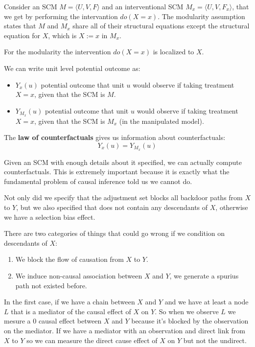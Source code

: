 \begin{definition}
    Consider an SCM $M=\langle U, V, F \rangle$ and an interventional SCM $M_x =\langle U, V, F_x \rangle$,
    that we get by performing the intervantion $do(X = x)$. The modularity assumption states
    that $M$ and $M_x$ share all of their structural equations except the structural equation
    for $X$, which is $X := x$ in $M_x$.
\end{definition}

For the modularity the intervention $do(X=x)$ is localized to $X$.

We can write unit level potential outcome as:
\begin{itemize}
    \item $Y_x (u)$ potential outcome that unit $u$ would observe if taking treatment
          $X = x$, given that the SCM is $M$.
    \item $Y_{M_x}(u)$ potential outcome that unit $u$ would observe if taking treatment
          $X = x$, given that the SCM is $M_x$ (in the manipulated model).
\end{itemize}

The \textbf{law of counterfactuals} gives us information about counterfactuals:
\begin{equation}
    Y_x(u) = Y_{M_x}(u)
\end{equation}

Given an SCM with enough details about it specified, we can actually compute
counterfactuals. This is extremely important because it is exactly what the fundamental
problem of causal inference told us we cannot do.

Not only did we specify that the adjustment set blocks all backdoor paths from $X$ to $Y$,
but we also specified that does not contain any descendants of $X$, otherwise we have
a selection bias effect.

There are two categories of things that could go wrong if we condition on descendants
of $X$:
\begin{enumerate}
    \item We block the flow of causation from $X$ to $Y$.
    \item We induce non-causal association between $X$ and $Y$, we generate a spurius
          path not existed before.
\end{enumerate}

In the first case, if we have a chain between $X$ and $Y$ and we have at least a
node $L$ that is a mediator of the causal effect of $X$ on $Y$. So when
we observe $L$ we mesure a $0$ causal effect between $X$ and $Y$ because it's blocked
by the observation on the mediator. If we have a mediator with an observation and direct link from $X$
to $Y$ so we can measure the direct cause effect of $X$ on $Y$ but not the undirect.

